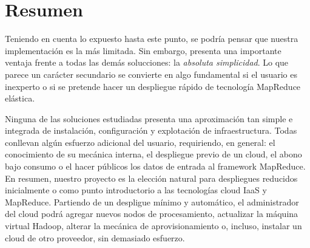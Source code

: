 \section{Resumen}\label{sec:resumenconclusiones}
\noindent Teniendo en cuenta lo expuesto hasta este punto, se podr\'ia pensar que nuestra implementaci\'on es la m\'as limitada. Sin embargo, presenta una importante ventaja frente a todas las dem\'as solucciones: la \emph{absoluta simplicidad}. Lo que parece un car\'acter secundario se convierte en algo fundamental si el usuario es inexperto o si se pretende hacer un despliegue r\'apido de tecnolog\'ia MapReduce el\'astica.\newline

Ninguna de las soluciones estudiadas presenta una aproximaci\'on tan simple e integrada de instalaci\'on, configuraci\'on y explotaci\'on de infraestructura. Todas conllevan alg\'un esfuerzo adicional del usuario, requiriendo, en general: el conocimiento de su mec\'anica interna, el despliegue previo de un cloud, el abono bajo consumo o el hacer p\'ublicos los datos de entrada al framework MapReduce. En resumen, nuestro proyecto es la elecci\'on natural para des\-plie\-gues reducidos inicialmente o como punto introductorio a las tecnolog\'ias cloud IaaS y MapReduce. Partiendo de un despligue m\'inimo y autom\'atico, el administrador del cloud podr\'a agregar nuevos nodos de procesamiento, ac\-tua\-li\-zar la m\'aquina virtual Hadoop, alterar la mec\'anica de aprovisionamiento o, incluso, instalar un cloud de otro proveedor, sin demasiado esfuerzo.

